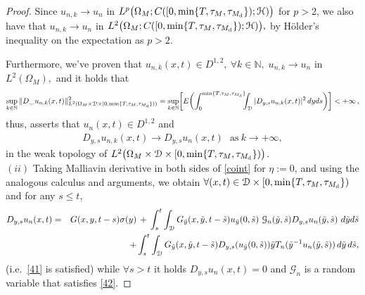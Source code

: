 \documentclass[reqno]{amsart}
\numberwithin{equation}{section}
\newcommand{\mN}{\mathbb{N}}
\newcommand{\Om}{\Omega}
\newcommand{\cd}{\mathcal{D}}
\newcommand{\ch}{\mathcal{H}}
\newcommand{\cg}{\mathcal{G}}
\begin{document}
\begin{proof}
Since $u_{n,k}\rightarrow u_{n}$ in
$L^p\bigl{(}\Om_M;C([0,\min\{T,\tau_M,\tau_{M_{\rm d}}\});\ch)\bigr{)}$ for $p>2$, we also have that
$u_{n,k}\rightarrow u_{n}$ in $L^2\bigl{(}\Om_M;C([0,\min\{T,\tau_M,\tau_{M_{\rm
d}}\});\ch)\bigr{)}, $ by H\"older's inequality on the expectation as $p>2$.

Furthermore, we've proven that $u_{n,k}(x,t)\in D^{1,2},\ \forall
k\in\mN, \; u_{n,k}\to u_n $ in $ L^2(\Omega_M), $ and it holds that
\begin{equation}
\sup_{k\in\mN} \|D_{.,.}u_{n,k}(x,t)\|^2_{L^2(\Om_M\times\cd
\times[0,\min\{T,\tau_M,\tau_{M_{\rm d}}\}))} = \underset{k\in\mN}{\text{sup}}\bigg[E\biggl{(}\int_0^{\min\{T,\tau_M,\tau_{M_{\rm d}}\}}\hspace*{-0.2cm}\int_{\cd}
|D_{y,s}u_{n,k}(x,t)|^2\, dyds\biggr{)}\bigg] < + \infty \,,
\end{equation}
thus, \cite[Lemma 1.2.3]{nual} asserts that $u_n(x,t)\in D^{1,2}$ and
\begin{align*}
D_{y,s}u_{n,k}(x,t)\rightarrow D_{y,s}u_{n}(x,t)\ \ \ \text{as}\ k\rightarrow+\infty ,
\end{align*}
in the weak topology of
$L^2\bigl{(}\Om_M\times\cd\times[0,\min\{T,\tau_M,\tau_{M_{\rm
d}}\})\bigr{)}$.
\\[0.5cm]
$(ii)$ Taking Malliavin derivative in both sides of \eqref{coint}
for $\eta:=0$, and using the analogous calculus and arguments, we
obtain $\forall (x,t)\in\cd\times[0,\min\{T,\tau_M,\tau_{M_{\rm
d}}\})$ and for any $s\leq t$,
\begin{eqnarray*}
D_{y,s}u_n(x,t)&=&G(x,y,t-s)\sigma(y) \,+\,\int_s^t\int_{\cd}G_{\Tilde{y}}(x,\Tilde{y},t-\Tilde{s})u_{\Tilde{y}}(0,\Tilde{s})
\ \cg_{n}(\Tilde{y},\Tilde{s})D_{y,s}u_{n}(\Tilde{y},\Tilde{s})\
d\Tilde{y}d\Tilde{s}\\
& &+\int_s^t\int_{\cd}G_{\Tilde{y}}(x,\Tilde{y},t-\Tilde{s})
D_{y,s}(u_{\Tilde{y}}(0,\Tilde{s}))\Tilde{y}T_n(\Tilde{y}^{-1} u_n(\Tilde{y},\Tilde{s}))\,
d\Tilde{y}\,d\Tilde{s},
\end{eqnarray*}
(i.e.~\eqref{41} is satisfied) while $\forall s>t$ it holds $D_{y,s}u_n(x,t)=0$ and $\cg_{n}$ is a random variable that satisfies \eqref{42}.


\end{proof}
\end{document}
